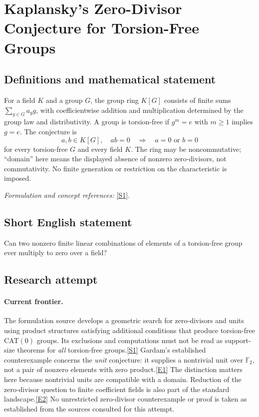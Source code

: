 \documentclass[11pt,a4paper]{article}
\newcommand{\F}{\mathbb{F}}
\newcommand{\sref}[2]{\hyperlink{source:#1:#2}{[S#2]}}
\newcommand{\eref}[2]{\hyperlink{extra:#1:#2}{[E#2]}}
\newif\ifshowcatalogue
\newcommand{\cataloguescope}[1]{\ifshowcatalogue
 \paragraph{Exact scope in the supplied catalogue.}
 \begin{quote}\small #1\end{quote}\fi}
\begin{document}
\setcounter{section}{203}
\clearpage
\section{\texorpdfstring{Kaplansky's Zero-Divisor Conjecture for Torsion-Free Groups}{Kaplansky's Zero-Divisor Conjecture for Torsion-Free Groups}}\label{204}
\subsection{Definitions and mathematical statement}
For a field $K$ and a group $G$, the group ring $K[G]$ consists of finite sums $\sum_{g\in G}a_gg$, with coefficientwise addition and multiplication determined by the group law and distributivity. A group is torsion-free if $g^m=e$ with $m\ge1$ implies $g=e$. The conjecture is
\[
 a,b\in K[G],\quad ab=0\quad\Longrightarrow\quad a=0\text{ or }b=0
\]
for every torsion-free $G$ and every field $K$. The ring may be noncommutative; ``domain'' here means the displayed absence of nonzero zero-divisors, not commutativity. No finite generation or restriction on the characteristic is imposed.
\par\smallskip\textit{Formulation and concept references:} \sref{204}{1}.
\cataloguescope{Prove that for every torsion-free group G and every field K, the group ring K[G] has no non-trivial zero-divisors, i.e. K[G] is a domain.}
\subsection{Short English statement}
Can two nonzero finite linear combinations of elements of a torsion-free group ever multiply to zero over a field?
\subsection{Research attempt}

\paragraph{Current frontier.}
The formulation source develops a geometric search for zero-divisors and
units using product structures satisfying additional conditions that
produce torsion-free CAT$(0)$ groups. Its exclusions and computations
must not be read as support-size theorems for \emph{all} torsion-free
groups.\sref{204}{1}
Gardam's established counterexample concerns the \emph{unit} conjecture:
it supplies a nontrivial unit over $\F_2$, not a pair of nonzero elements
with zero product.\eref{204}{1}
The distinction matters here because nontrivial units are compatible with
a domain. Reduction of the zero-divisor question to finite coefficient
fields is also part of the standard landscape.\eref{204}{2}
No unrestricted zero-divisor counterexample or proof is taken as established
from the sources consulted for this attempt.
\end{document}
